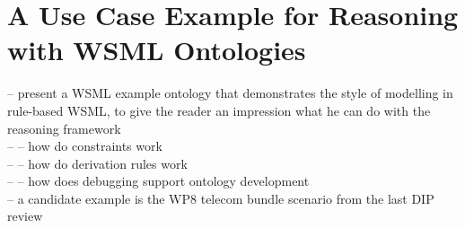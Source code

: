 \section{A Use Case Example for Reasoning with WSML Ontologies\label{sec:usecase}}
-- present a WSML example ontology that demonstrates the style of modelling in rule-based WSML, to give the reader an impression what he can do with the reasoning framework \\
\phantom{mm} -- -- how do constraints work \\
\phantom{mm} -- -- how do derivation rules work \\
\phantom{mm} -- -- how does debugging support ontology development \\
-- a candidate example is the WP8 telecom bundle scenario from the last DIP review \\
